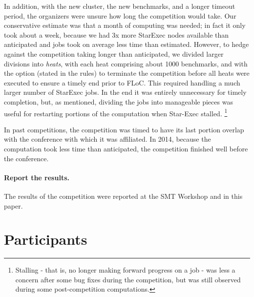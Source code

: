 \documentclass[twoside,11pt]{article}
\begin{document}
In addition, with the new cluster, the new benchmarks, and a longer timeout period, the organizers were unsure how long the competition would take. Our conservative estimate was that a month of computing was needed; in fact it only took about a week, because we had 3x more StarExec nodes available than anticipated and jobs took on average less time than estimated. However, to hedge against the competition taking longer than anticipated, we divided larger divisions into \textit{heats}, with each heat comprising about 1000 benchmarks, and with the option (stated in the rules) to terminate the competition before all heats were executed to ensure a timely end prior to FLoC. This required handling a much larger number of StarExec jobs. In the end it was entirely unnecessary for timely completion, but, as mentioned, dividing the jobs into manageable pieces was useful for restarting portions of the computation when Star-Exec stalled.
\footnote{Stalling - that is, no longer making forward progress on a job - was less a concern after some bug fixes during the competition, but was still observed during some post-competition computations.}

In past competitions, the competition was timed to have its last portion overlap with the conference with which it was affiliated. In 2014, because the computation took less time than anticipated, the competition finished well before the conference.

\paragraph{Report the results.} The results of the competition were reported at the SMT Workshop and in this paper.

\section{Participants}
\label{sec:participants}
\end{document}
